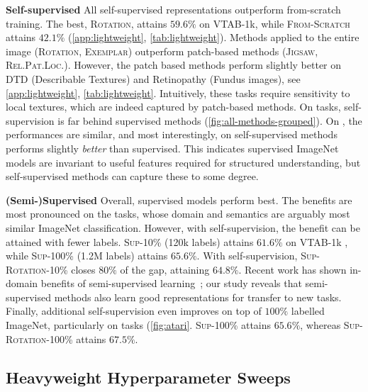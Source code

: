 \textbf{Self-supervised}\quad
All self-supervised representations outperform from-scratch training. The best, \textsc{Rotation}, attains $59.6\%$ on VTAB-1k, while \textsc{From-Scratch} attains $42.1\%$ (\ref{app:lightweight}, \ref{tab:lightweight}).
Methods applied to the entire image (\textsc{Rotation}, \textsc{Exemplar}) outperform patch-based methods (\textsc{Jigsaw}, \textsc{Rel.Pat.Loc.}).
However, the patch based methods perform slightly better on DTD (Describable Textures) and Retinopathy (Fundus images), see \ref{app:lightweight}, \ref{tab:lightweight}.
Intuitively, these tasks require sensitivity to local textures, which are indeed captured by patch-based methods. On \taskNatural{} tasks, self-supervision is far behind supervised methods (\ref{fig:all-methods-grouped}).
On \taskSpecialized{}, the performances are similar, and most interestingly, on \taskStructured{} self-supervised methods performs slightly \emph{better} than supervised. This indicates supervised ImageNet models are invariant to useful features required for structured understanding, but self-supervised methods can capture these to some degree.

\textbf{(Semi-)Supervised}\quad
Overall, supervised models perform best. The benefits are most pronounced on the \taskNatural{} tasks, whose domain and semantics are arguably most similar ImageNet classification. However, with self-supervision, the benefit can be attained with fewer labels.
\textsc{Sup-10\%} (120k labels) attains $61.6\%$ on VTAB-1k , while \textsc{Sup-100\%} (1.2M labels) attains $65.6\%$.
With self-supervision, \textsc{Sup-Rotation-10\%} closes $80\%$ of the gap, attaining $64.8\%$.
Recent work has shown in-domain benefits of semi-supervised learning~\citep{henaff2019data,berthelot2019remixmatch}; our study reveals that semi-supervised methods also learn good representations for transfer to new tasks. Finally, additional self-supervision even improves on top of $100\%$ labelled ImageNet, particularly on \taskStructured{} tasks (\ref{fig:atari}.
\textsc{Sup-100\%} attains $65.6\%$, whereas \textsc{Sup-Rotation-100\%} attains $67.5\%$.

\subsection{Heavyweight Hyperparameter Sweeps \label{sec:heavy}}


